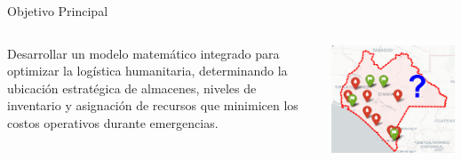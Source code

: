 \documentclass[
  ignorenonframetext,
]{beamer}
\begin{document}
\begin{frame}{Objetivo Principal}
\label{objetivo-principal}
\begin{columns}[T]
\begin{column}{0.5\linewidth}
\justifying
{}

Desarrollar un modelo matemático integrado para optimizar la logística
humanitaria, determinando la ubicación estratégica de almacenes, niveles
de inventario y asignación de recursos que minimicen los costos
operativos durante emergencias.
\end{column}

\begin{column}{0.5\linewidth}
\centering

\includegraphics[width=0.8\linewidth,height=\textheight,keepaspectratio]{chiapas_almacen.png}
\end{column}
\end{columns}
\end{frame}
\end{document}
